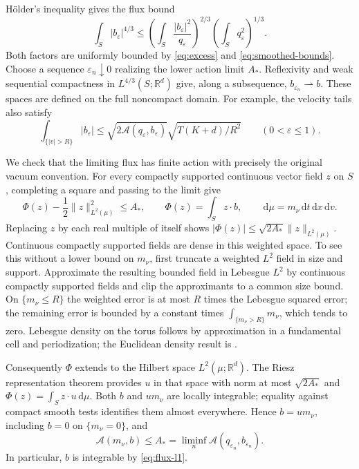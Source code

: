 \documentclass[11pt]{article}
\newcommand{\R}{\mathbb R}
\newcommand{\dd}{\,\mathrm d}
\newcommand{\A}{\mathcal A}
\begin{document}
H\"older's inequality gives the flux bound
\begin{equation}\label{eq:flux-compactness}
 \int_S|b_\varepsilon|^{4/3}
 \leq
 \left(\int_S\frac{|b_\varepsilon|^2}{q_\varepsilon}\right)^{2/3}
 \left(\int_Sq_\varepsilon^2\right)^{1/3}.
\end{equation}
Both factors are uniformly bounded by \eqref{eq:excess} and
\eqref{eq:smoothed-bounds}. Choose a sequence
$\varepsilon_n\downarrow0$ realizing the lower action limit $A_*$.
Reflexivity and weak sequential compactness in $L^{4/3}(S;\R^d)$
\cite[Theorems~3.18 and~4.10]{Brezis} give, along a subsequence,
$b_{\varepsilon_n}\rightharpoonup b$.
These spaces are defined on the full noncompact domain.
For example, the velocity tails also satisfy
\[
 \int_{\{|v|>R\}}|b_\varepsilon|
 \leq\sqrt{2\A(q_\varepsilon,b_\varepsilon)}
           \sqrt{T(K+d)/R^2}\qquad(0<\varepsilon\leq1).
\]

We check that the limiting flux has finite action with precisely the
original vacuum convention.
For every compactly supported continuous vector field $z$ on $S$,
completing a square and passing to the limit give
\begin{equation}\label{eq:dual-action}
 \Phi(z)-\frac12\|z\|_{L^2(\mu)}^2\leq A_*,
 \qquad
 \Phi(z)=\int_Sz\cdot b,\qquad
 \dd\mu=m_\nu\dd t\dd x\dd v .
\end{equation}
Replacing $z$ by each real multiple of itself shows
$|\Phi(z)|\leq\sqrt{2A_*}\|z\|_{L^2(\mu)}$.
Continuous compactly supported fields are dense in this weighted space.
To see this without a lower bound on $m_\nu$, first truncate a weighted
$L^2$ field in size and support. Approximate the resulting bounded field
in Lebesgue $L^2$ by continuous compactly supported fields and clip the
approximants to a common size bound. On $\{m_\nu\leq R\}$ the weighted
error is at most $R$ times the Lebesgue squared error; the remaining
error is bounded by a constant times
$\int_{\{m_\nu>R\}}m_\nu$, which tends to zero.
Lebesgue density on the torus follows by approximation in a fundamental
cell and periodization; the Euclidean density result is
\cite[Theorem~4.12]{Brezis}.

Consequently $\Phi$ extends to the Hilbert space $L^2(\mu;\R^d)$.
The Riesz representation theorem \cite[Theorem~5.5]{Brezis}
provides $u$ in that space with norm at most $\sqrt{2A_*}$ and
$\Phi(z)=\int_Sz\cdot u\dd\mu$.
Both $b$ and $um_\nu$ are locally integrable; equality against compact
smooth tests identifies them almost everywhere. Hence $b=um_\nu$,
including $b=0$ on $\{m_\nu=0\}$, and
\begin{equation}\label{eq:action-lower}
 \A(m_\nu,b)\leq A_*=
 \liminf_n\A(q_{\varepsilon_n},b_{\varepsilon_n}).
\end{equation}
In particular, $b$ is integrable by \eqref{eq:flux-l1}.
\end{document}
